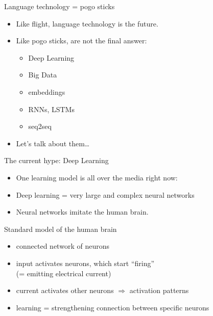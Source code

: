 \documentclass[xcolor={usenames,svgnames,x11names,dvipsnames,table}]{beamer}
\begin{document}
\begin{frame}{Language technology = pogo sticks}
    \begin{itemize}
        \item Like flight, language technology is the future.
        \item Like pogo sticks,  are not the final answer:
            \begin{itemize}
                \item Deep Learning
                \item Big Data
                \item embeddings
                \item RNNs, LSTMs
                \item seq2seq
            \end{itemize}
        \item Let's talk about them\ldots
    \end{itemize}
\end{frame}

\begin{frame}{The current hype: Deep Learning}
    \begin{itemize}
        \item One learning model is all over the media right now:\\
        \item Deep learning = very large and complex neural networks
        \item Neural networks imitate the human brain.
    \end{itemize}

    \pause
    \begin{block}{Standard model of the human brain}
        \begin{itemize}
            \item connected network of neurons
            \item input activates neurons, which start ``firing''\\
                (= emitting electrical current)
            \item current activates other neurons $\Rightarrow$ activation patterns
            \item learning = strengthening connection between specific neurons
        \end{itemize}
    \end{block}
\end{frame}
\end{document}
